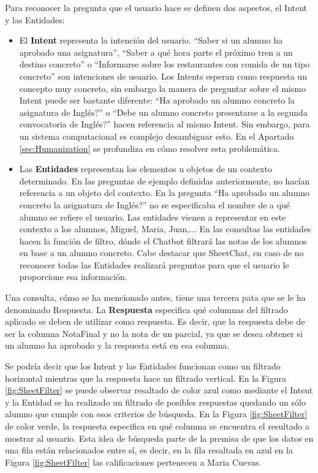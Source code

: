 Para reconocer la pregunta que el usuario hace se definen dos aspectos, el Intent y las Entidades:
\begin{itemize}
	\item El \textbf{Intent} representa la intención del usuario. ``Saber si un alumno ha aprobado una asignatura'', ``Saber a qué hora parte el próximo tren a un destino concreto'' o ``Informarse sobre los restaurantes con comida de un tipo concreto'' son intenciones de usuario. Los Intents esperan como respuesta un concepto muy concreto, sin embargo la manera de preguntar sobre el mismo Intent puede ser bastante diferente: ``Ha aprobado un alumno concreto la asignatura de Inglés?'' o ``Debe un alumno concreto presentarse a la segunda convocatoria de Inglés?'' hacen referencia al mismo Intent. Sin embargo, para un sistema computacional es complejo desambiguar esto. En el Apartado \ref{sec:Humanization} se profundiza en cómo resolver esta problemática.
	\item Las \textbf{Entidades} representan los elementos u objetos de un contexto determinado. En las preguntas de ejemplo definidas anteriormente, no hacían referencia a un objeto del contexto. En la pregunta ``Ha aprobado un alumno concreto la asignatura de Inglés?'' no se especificaba el nombre de a qué alumno se refiere el usuario. Las entidades vienen a representar en este contexto a los alumnos, Miguel, Maria, Juan,... En las consultas las entidades hacen la función de filtro, dónde el Chatbot filtrará las notas de los alumnos en base a un alumno concreto. Cabe destacar que SheetChat, en caso de no reconocer todas las Entidades realizará preguntas para que el usuario le proporcione esa información.
\end{itemize}

Una consulta, cómo se ha mencionado antes, tiene una tercera pata que se le ha denominado Respuesta. La \textbf{Respuesta} especifica qué columnas del filtrado aplicado se deben de utilizar como respuesta. Es decir, que la respuesta debe de ser la columna NotaFinal y no la nota de un parcial, ya que se desea obtener si un alumno ha aprobado y la respuesta está en esa columna.

Se podría decir que los Intent y las Entidades funcionan como un filtrado horizontal mientras que la respuesta hace un filtrado vertical. En la Figura \ref{fig:SheetFilter} se puede observar resaltado de color azul como mediante el Intent y la Entidad se ha realizado un filtrado de posibles respuestas quedando un sólo alumno que cumple con esos criterios de búsqueda. En la Figura \ref{fig:SheetFilter} de color verde, la respuesta especifica en qué columna se encuentra el resultado a mostrar al usuario. Esta idea de búsqueda parte de la premisa de que los datos en una fila están relacionados entre sí, es decir, en la fila resaltada en azul en la Figura \ref{fig:SheetFilter} las calificaciones pertenecen a Maria Cuevas.

